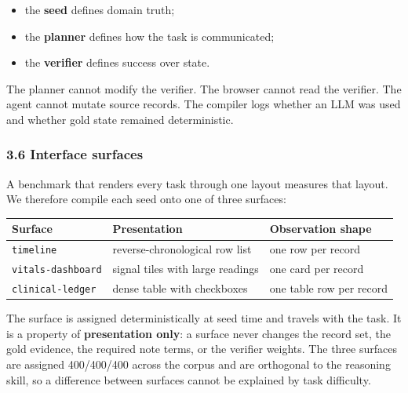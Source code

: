 \documentclass[
]{article}
\providecommand{\tightlist}{%
  \setlength{\itemsep}{0pt}\setlength{\parskip}{0pt}}
\begin{document}
\begin{itemize}
\tightlist
\item
  the \textbf{seed} defines domain truth;
\item
  the \textbf{planner} defines how the task is communicated;
\item
  the \textbf{verifier} defines success over state.
\end{itemize}

The planner cannot modify the verifier. The browser cannot read the
verifier. The agent cannot mutate source records. The compiler logs
whether an LLM was used and whether gold state remained deterministic.

\subsubsection{3.6 Interface surfaces}\label{interface-surfaces}

A benchmark that renders every task through one layout measures that
layout. We therefore compile each seed onto one of three surfaces:

\begin{longtable}[]{@{}
  >{\raggedright\arraybackslash}p{}
  >{\raggedright\arraybackslash}p{}
  >{\raggedright\arraybackslash}p{}@{}}
\toprule\noalign{}
\begin{minipage}[b]{\linewidth}\raggedright
Surface
\end{minipage} & \begin{minipage}[b]{\linewidth}\raggedright
Presentation
\end{minipage} & \begin{minipage}[b]{\linewidth}\raggedright
Observation shape
\end{minipage} \\
\midrule\noalign{}
\endhead
\bottomrule\noalign{}
\endlastfoot
\texttt{timeline} & reverse-chronological row list & one row per
record \\
\texttt{vitals-dashboard} & signal tiles with large readings & one card
per record \\
\texttt{clinical-ledger} & dense table with checkboxes & one table row
per record \\
\end{longtable}

The surface is assigned deterministically at seed time and travels with
the task. It is a property of \textbf{presentation only}: a surface
never changes the record set, the gold evidence, the required note
terms, or the verifier weights. The three surfaces are assigned
400/400/400 across the corpus and are orthogonal to the reasoning skill,
so a difference between surfaces cannot be explained by task difficulty.
\end{document}
